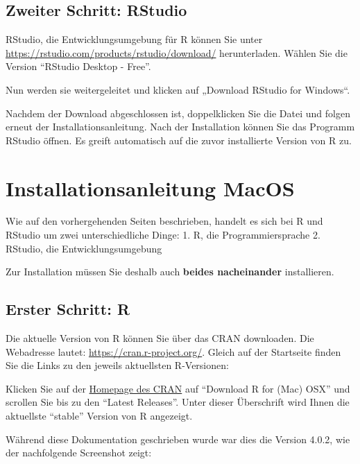\documentclass[
]{book}
\begin{document}
\hypertarget{zweiter-schritt-rstudio}{%
\subsection{Zweiter Schritt: RStudio}\label{zweiter-schritt-rstudio}}

RStudio, die Entwicklungsumgebung für R können Sie unter \url{https://rstudio.com/products/rstudio/download/} herunterladen.
Wählen Sie die Version ``RStudio Desktop - Free''.

Nun werden sie weitergeleitet und klicken auf „Download RStudio for Windows``.

Nachdem der Download abgeschlossen ist, doppelklicken Sie die Datei und folgen erneut der Installationsanleitung. Nach der Installation können Sie das Programm RStudio öffnen. Es greift automatisch auf die zuvor installierte Version von R zu.

\hypertarget{installationsanleitung-macos}{%
\section{Installationsanleitung MacOS}\label{installationsanleitung-macos}}

Wie auf den vorhergehenden Seiten beschrieben, handelt es sich bei R und RStudio um zwei unterschiedliche Dinge:
1. R, die Programmiersprache
2. RStudio, die Entwicklungsumgebung

Zur Installation müssen Sie deshalb auch \textbf{beides nacheinander} installieren.

\hypertarget{erster-schritt-r-1}{%
\subsection{Erster Schritt: R}\label{erster-schritt-r-1}}

Die aktuelle Version von R können Sie über das CRAN downloaden. Die Webadresse lautet: \href{https://cran.r-project.org}{https://cran.r-project.org/}. Gleich auf der Startseite finden Sie die Links zu den jeweils aktuellsten R-Versionen:

Klicken Sie auf der \href{https://cran.r-project.org}{Homepage des CRAN} auf ``Download R for (Mac) OSX'' und scrollen Sie bis zu den ``Latest Releases''. Unter dieser Überschrift wird Ihnen die aktuellste ``stable'' Version von R angezeigt.

Während diese Dokumentation geschrieben wurde war dies die Version 4.0.2, wie der nachfolgende Screenshot zeigt:
\end{document}
